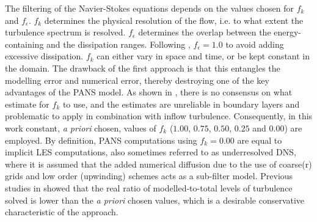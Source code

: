 \documentclass[a4paper,10pt,preprint,3p]{elsarticle}
\begin{document}
The filtering of the Navier-Stokes equations depends on the values chosen for $f_k$ and $f_{\epsilon}$. $f_k$ determines the physical resolution of the flow, i.e. to what extent the turbulence spectrum is resolved. $f_{\epsilon}$ determines the overlap between the energy-containing and the dissipation ranges. Following \citet{klapwijk2019pans}, $f_{\epsilon} = 1.0$ to avoid adding excessive dissipation. $f_k$ can either vary in space and time, or be kept constant in the domain. The drawback of the first approach is that this entangles the modelling error and numerical error, thereby destroying one of the key advantages of the PANS model. As shown in \citet{klapwijk2019accuracy}, there is no consensus on what estimate for $f_k$ to use, and the estimates are unreliable in boundary layers and problematic to apply in combination with inflow turbulence. Consequently, in this work constant, \textit{a priori} chosen, values of $f_k$ ($1.00$, $0.75$, $0.50$, $0.25$ and $0.00$) are employed. By definition, PANS computations using $f_k = 0.00$ are equal to implicit LES computations, also sometimes referred to as underresolved DNS, where it is assumed that the added numerical diffusion due to the use of coarse(r) grids and low order (upwinding) schemes acts as a sub-filter model. Previous studies in \cite{klapwijk2019accuracy} showed that the real ratio of modelled-to-total levels of turbulence solved is lower than the \textit{a priori} chosen values, which is a desirable conservative characteristic of the approach.
\end{document}
